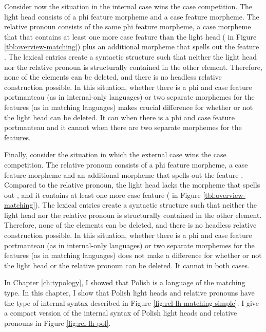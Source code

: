 Consider now the situation in the internal case wins the case competition. The light head consists of a phi feature morpheme and a case feature morpheme. The relative pronoun consists of the same phi feature morpheme, a case morpheme that that contains at least one more case feature than the light head ( in Figure \ref{tbl:overview-matching}) plus an additional morpheme that spells out the feature . The lexical entries create a syntactic structure such that neither the light head nor the relative pronoun is structurally contained in the other element. Therefore, none of the elements can be deleted, and there is no headless relative construction possible.
In this situation, whether there is a phi and case feature portmanteau (as in internal-only languages) or two separate morphemes for the features (as in matching languages) makes crucial difference for whether or not the light head can be deleted. It can when there is a phi and case feature portmanteau and it cannot when there are two separate morphemes for the features.

Finally, consider the situation in which the external case wins the case competition. The relative pronoun consists of a phi feature morpheme, a case feature morpheme and an additional morpheme that spells out the feature . Compared to the relative pronoun, the light head lacks the morpheme that spells out , and it contains at least one more case feature ( in Figure \ref{tbl:overview-matching}). The lexical entries create a syntactic structure such that neither the light head nor the relative pronoun is structurally contained in the other element. Therefore, none of the elements can be deleted, and there is no headless relative construction possible.
In this situation, whether there is a phi and case feature portmanteau (as in internal-only languages) or two separate morphemes for the features (as in matching languages) does not make a difference for whether or not the light head or the relative pronoun can be deleted. It cannot in both cases.

In Chapter \ref{ch:typology}, I showed that Polish is a language of the matching type. In this chapter, I show that Polish light heads and relative pronouns have the type of internal syntax described in Figure \ref{fig:rel-lh-matching-simple}. I give a compact version of the internal syntax of Polish light heads and relative pronouns in Figure \ref{fig:rel-lh-pol}.

